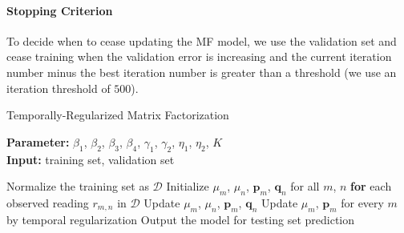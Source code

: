\paragraph*{Stopping Criterion}

To decide when to cease updating the MF model, we use the validation set and cease training when the validation error is increasing and the current iteration number minus the best iteration number is greater than a threshold (we use an iteration threshold of $500$). 

\begin{algorithm}
	\caption{Temporally-Regularized Matrix Factorization}
	\label{alg:TRMF}
	\textbf{Parameter:} $\beta_1$, $\beta_2$, $\beta_3$, $\beta_4$, $\gamma_1$, $\gamma_2$, $\eta_1$, $\eta_2$, $K$\\
	\textbf{Input:} training set, validation set
	\begin{algorithmic}
		\State Normalize the training set as $\mathcal{D}$
		\State Initialize $\mu_m$, $\mu_n$, $\mathbf{p}_m$, $\mathbf{q}_n$ for all $m$, $n$
		\Repeat
			\State \textbf{for} each observed reading $r_{m,n}$ in $\mathcal{D}$
				\State \indent Update $\mu_m$, $\mu_n$, $\mathbf{p}_{m}$, $\mathbf{q}_{n}$
			\State Update $\mu_m$, $\mathbf{p}_m$ for every $m$ by temporal regularization
		\State Output the model for testing set prediction
	\end{algorithmic}
\end{algorithm}
